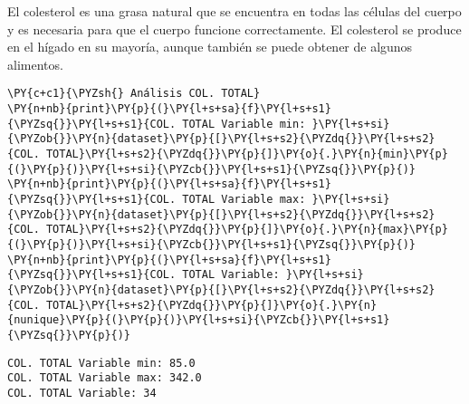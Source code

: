 El colesterol es una grasa natural que se encuentra en todas las células del cuerpo y es necesaria para que el cuerpo funcione correctamente. El colesterol se produce en el hígado en su mayoría, aunque también se puede obtener de algunos alimentos.

    \begin{tcolorbox}[breakable, size=fbox, boxrule=1pt, pad at break*=1mm,colback=cellbackground, colframe=cellborder]
\begin{Verbatim}[commandchars=\\\{\}]
\PY{c+c1}{\PYZsh{} Análisis COL. TOTAL}
\PY{n+nb}{print}\PY{p}{(}\PY{l+s+sa}{f}\PY{l+s+s1}{\PYZsq{}}\PY{l+s+s1}{COL. TOTAL Variable min: }\PY{l+s+si}{\PYZob{}}\PY{n}{dataset}\PY{p}{[}\PY{l+s+s2}{\PYZdq{}}\PY{l+s+s2}{COL. TOTAL}\PY{l+s+s2}{\PYZdq{}}\PY{p}{]}\PY{o}{.}\PY{n}{min}\PY{p}{(}\PY{p}{)}\PY{l+s+si}{\PYZcb{}}\PY{l+s+s1}{\PYZsq{}}\PY{p}{)}
\PY{n+nb}{print}\PY{p}{(}\PY{l+s+sa}{f}\PY{l+s+s1}{\PYZsq{}}\PY{l+s+s1}{COL. TOTAL Variable max: }\PY{l+s+si}{\PYZob{}}\PY{n}{dataset}\PY{p}{[}\PY{l+s+s2}{\PYZdq{}}\PY{l+s+s2}{COL. TOTAL}\PY{l+s+s2}{\PYZdq{}}\PY{p}{]}\PY{o}{.}\PY{n}{max}\PY{p}{(}\PY{p}{)}\PY{l+s+si}{\PYZcb{}}\PY{l+s+s1}{\PYZsq{}}\PY{p}{)}
\PY{n+nb}{print}\PY{p}{(}\PY{l+s+sa}{f}\PY{l+s+s1}{\PYZsq{}}\PY{l+s+s1}{COL. TOTAL Variable: }\PY{l+s+si}{\PYZob{}}\PY{n}{dataset}\PY{p}{[}\PY{l+s+s2}{\PYZdq{}}\PY{l+s+s2}{COL. TOTAL}\PY{l+s+s2}{\PYZdq{}}\PY{p}{]}\PY{o}{.}\PY{n}{nunique}\PY{p}{(}\PY{p}{)}\PY{l+s+si}{\PYZcb{}}\PY{l+s+s1}{\PYZsq{}}\PY{p}{)}
\end{Verbatim}
\end{tcolorbox}

    \begin{Verbatim}[commandchars=\\\{\}]
COL. TOTAL Variable min: 85.0
COL. TOTAL Variable max: 342.0
COL. TOTAL Variable: 34
    \end{Verbatim}

